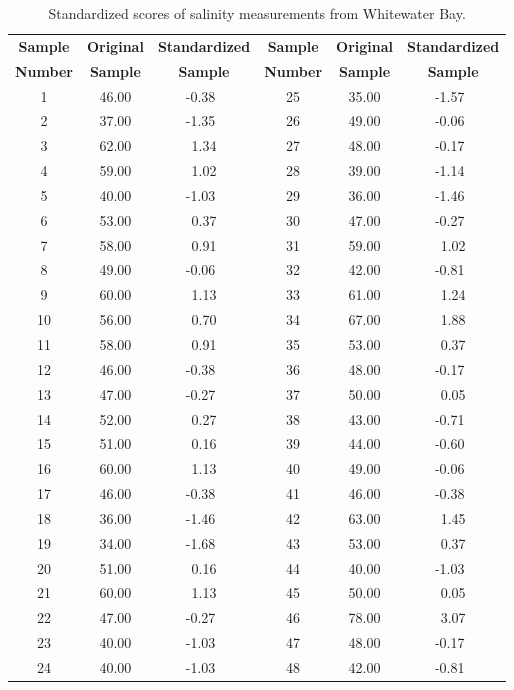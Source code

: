 \begin{table}[h]
\centering
\small
\begin{tabular}{|c|c|c||c|c|c|} \hline
\bf{Sample} &  \bf{Original}  & \bf{Standardized} & \bf{Sample} & \bf{Original}  & \bf{Standardized} \\
\bf{Number} & \bf{Sample} & \bf{Sample}  & \bf{Number} & \bf{Sample} & \bf{Sample} \\ \hline
1 & 46.00 & -0.38 \, & 25 & 35.00 & -1.57 \, \\ \hline
2 & 37.00 & -1.35 \, & 26 & 49.00 & -0.06 \, \\ \hline
3 & 62.00 & 1.34 & 27 & 48.00 & -0.17 \,  \\ \hline
4 & 59.00 & 1.02 & 28 & 39.00 & -1.14  \, \\ \hline
5 & 40.00 & -1.03 \, & 29 & 36.00 & -1.46 \, \\ \hline
6 & 53.00 & 0.37 & 30 & 47.00 & -0.27 \, \\ \hline
7 & 58.00 & 0.91 & 31 & 59.00 & 1.02 \\ \hline
8 & 49.00 & -0.06 \, & 32 & 42.00 & -0.81 \,  \\ \hline
9 & 60.00 & 1.13 & 33 & 61.00 & 1.24 \\ \hline
10 & 56.00 & 0.70 & 34 & 67.00 & 1.88 \\ \hline
11 & 58.00 & 0.91 & 35 & 53.00 & 0.37 \\ \hline
12 & 46.00 & -0.38 \, & 36 & 48.00 & -0.17 \, \\ \hline
13 & 47.00 & -0.27 \, & 37 & 50.00 & 0.05 \\ \hline
14 & 52.00 & 0.27 & 38 & 43.00 & -0.71 \, \\ \hline
15 & 51.00 & 0.16 & 39 & 44.00 & -0.60 \, \\ \hline
16 & 60.00 & 1.13 & 40 & 49.00 & -0.06 \, \\ \hline
17 & 46.00 & -0.38 \, & 41 & 46.00 & -0.38 \, \\ \hline
18 & 36.00 & -1.46 \, & 42 & 63.00 & 1.45 \\ \hline
19 & 34.00 & -1.68 \, & 43 & 53.00 & 0.37 \\ \hline
20 & 51.00 & 0.16 & 44 & 40.00 & -1.03 \, \\ \hline
21 & 60.00 & 1.13 & 45 & 50.00 & 0.05 \\ \hline
22 & 47.00 & -0.27 \, & 46 & 78.00 & 3.07 \\ \hline
23 & 40.00 & -1.03 \, & 47 & 48.00 & -0.17 \, \\ \hline
24 & 40.00 & -1.03 \, & 48 & 42.00 & -0.81 \, \\ \hline
\end{tabular}
\normalsize
\caption{Standardized scores of salinity measurements from Whitewater Bay.}
\label{tbl:salinity}
\end{table}

